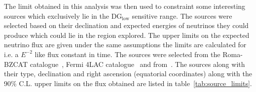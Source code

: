 

The limit obtained in this analysis was then used to constraint some interesting sources which exclusively lie in the DG$_{\text{low}}$ sensitive range. The sources were selected based on their declination and expected energies of neutrinos they could produce which could lie in the region explored. The upper limits on the expected neutrino flux are given under the same assumptions the limits are calculated for i.e. a $E^{-2}$ like flux constant in time. The sources were selected from the Roma-BZCAT catalogue~\cite{Massaro:2008ye}, Fermi 4LAC catalogue~\cite{Ballet:2020hze} and from~\cite{Wakely:2007qpa}. The sources along with their type, declination and right ascension (equatorial coordinates) along with the 90\% C.L. upper limits on the flux obtained are listed in table~\ref{tab:source_limits}. 

